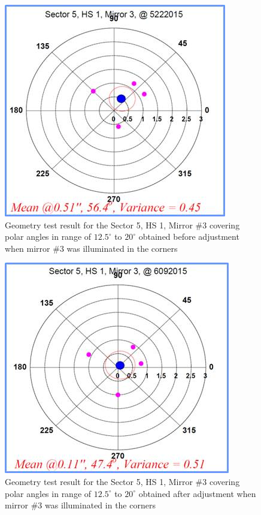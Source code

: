 \begin{figure}[ht]
    \centering
    \includegraphics[width=1.0\linewidth,trim={0 0cm 0 0},clip]{images/Ch_5_1_3_Before.jpg}
    \caption{Geometry test result for the Sector 5, HS 1, Mirror \#3 covering polar angles in range of $12.5^\circ$ to $20^\circ$ obtained before adjustment when mirror \#3 was illuminated in the corners}
    \label{fig:Ch_5_1_3_Before}
\end{figure}

\begin{figure}[ht]
    \centering
    \includegraphics[width=1.0\linewidth,trim={0 0cm 0 0},clip]{images/Ch_5_1_3_After.jpg}
    \caption{Geometry test result for the Sector 5, HS 1, Mirror \#3 covering polar angles in range of $12.5^\circ$ to $20^\circ$ obtained after adjustment when mirror \#3 was illuminated in the corners}
    \label{fig:Ch_5_1_3_After}
\end{figure}

